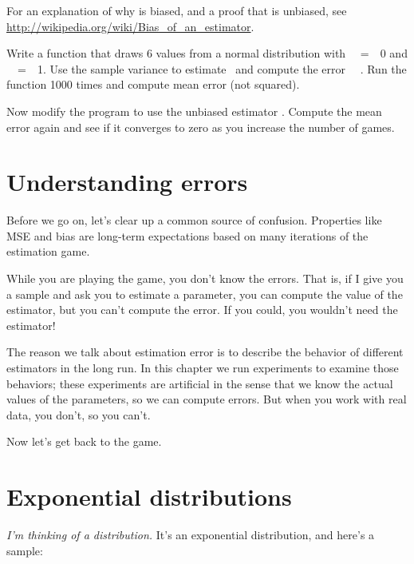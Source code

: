 \documentclass[12pt]{book}
\begin{document}
For an explanation of why \Ssq is biased, and a proof that
\Snsq is unbiased, see
\url{http://wikipedia.org/wiki/Bias_of_an_estimator}.

\begin{exercise}
Write a function that draws 6 values from a normal distribution with
\mymu~~=~~0 and \mysigma~~=~~1.  Use the sample variance to estimate
\sigmasq~and compute the error \Ssq~\minus~\mysigma{}.
Run the function 1000 times and compute mean error (not squared).

Now modify the program to use the unbiased estimator \Snsq.
Compute the mean error again and see if it converges to zero as you
increase the number of games.

\end{exercise}


\section{Understanding errors}

Before we go on, let's clear up a common source of confusion.
Properties like MSE and bias are long-term expectations based on
many iterations of the estimation game.

While you are playing the game, you don't know the errors.  That is,
if I give you a sample and ask you to estimate a parameter, you
can compute the value of the estimator, but you can't compute the
error.  If you could, you wouldn't need the estimator!

The reason we talk about estimation error is to describe the behavior
of different estimators in the long run.  In this chapter we run
experiments to examine those behaviors; these experiments are
artificial in the sense that we know the actual values of the
parameters, so we can compute errors.  But when you work with
real data, you don't, so you can't.

Now let's get back to the game.


\section{Exponential distributions}

{\em I'm thinking of a distribution.}  It's an exponential distribution, and 
here's a sample:
\end{document}

